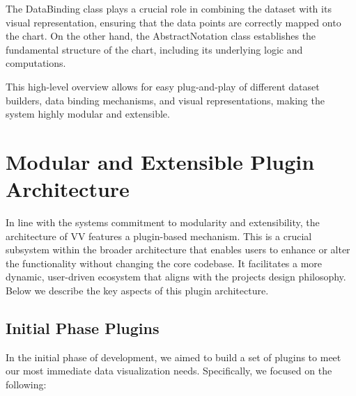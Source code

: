 The DataBinding class plays a crucial role in combining the dataset with
its visual representation, ensuring that the data points are correctly
mapped onto the chart. On the other hand, the AbstractNotation class
establishes the fundamental structure of the chart, including its
underlying logic and computations.

This high-level overview allows for easy plug-and-play of different
dataset builders, data binding mechanisms, and visual representations,
making the system highly modular and extensible.

\section{Modular and Extensible Plugin
Architecture}\label{modular-and-extensible-plugin-architecture}

In line with the system\textquotesingle s commitment to modularity and
extensibility, the architecture of VV features a plugin-based mechanism.
This is a crucial subsystem within the broader architecture that enables
users to enhance or alter the functionality without changing the core
codebase. It facilitates a more dynamic, user-driven ecosystem that
aligns with the project\textquotesingle s design philosophy. Below we
describe the key aspects of this plugin architecture.

\subsection{Initial Phase Plugins}\label{initial-phase-plugins}

In the initial phase of development, we aimed to build a set of plugins
to meet our most immediate data visualization needs. Specifically, we
focused on the following:

